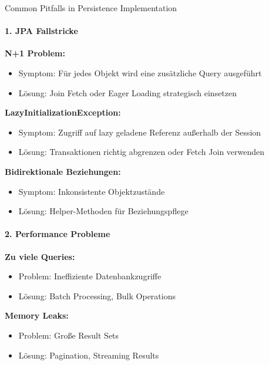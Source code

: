 \begin{concept}{Common Pitfalls in Persistence Implementation}
\paragraph{1. JPA Fallstricke}

    \textbf{N+1 Problem:}
    \begin{itemize}
        \item Symptom: Für jedes Objekt wird eine zusätzliche Query ausgeführt
        \item Lösung: Join Fetch oder Eager Loading strategisch einsetzen
    \end{itemize}
     \textbf{LazyInitializationException:}
    \begin{itemize}
        \item Symptom: Zugriff auf lazy geladene Referenz außerhalb der Session
        \item Lösung: Transaktionen richtig abgrenzen oder Fetch Join verwenden
    \end{itemize}
     \textbf{Bidirektionale Beziehungen:}
    \begin{itemize}
        \item Symptom: Inkonsistente Objektzustände
        \item Lösung: Helper-Methoden für Beziehungspflege
    \end{itemize}


\paragraph{2. Performance Probleme}
     \textbf{Zu viele Queries:}
    \begin{itemize}
        \item Problem: Ineffiziente Datenbankzugriffe
        \item Lösung: Batch Processing, Bulk Operations
    \end{itemize}
     \textbf{Memory Leaks:}
    \begin{itemize}
        \item Problem: Große Result Sets
        \item Lösung: Pagination, Streaming Results
    \end{itemize}
\end{concept}

